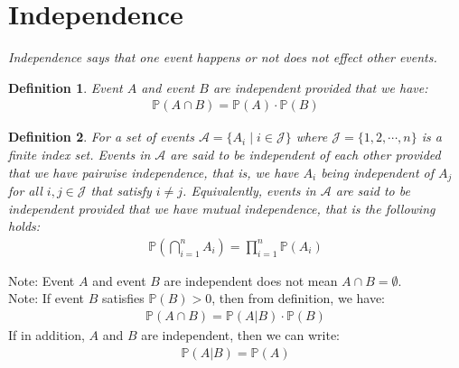 \documentclass[11pt]{book}
\theoremstyle{break}
\theoremstyle{break}
\newtheorem{defn}{Definition}[corL]
\newcommand{\note}{\color{red}Note: \color{black}}
\begin{document}
\newpage
\section[Independence]{\color{red}Independence\color{black}}
\textit{Independence says that one event happens or not does not effect other events.}
\begin{defn}
Event $A$ and event $B$ are independent provided that we have:
\begin{align*}
\mathbb{P}(A\cap B) = \mathbb{P}(A) \cdot \mathbb{P}(B)
\end{align*}
\end{defn}

\begin{defn}
For a set of events $\mathcal{A} = \{A_i \mid i \in \mathcal{J}\}$ where $\mathcal{J} = \{1,2,\cdots, n\}$ is a finite index set. Events in $\mathcal{A}$ are said to be independent of each other provided that we have pairwise independence, that is, we have $A_i$ being independent of $A_j$ for all $i,j \in \mathcal{J}$ that satisfy $i\neq j$. Equivalently, events in $\mathcal{A}$ are said to be independent provided that we have mutual independence, that is the following holds:
\begin{align*}
\mathbb{P}\left( \bigcap_{i=1}^n A_i \right) = \prod_{i=1}^n \mathbb{P}(A_i)
\end{align*}
\end{defn}

\note Event $A$ and event $B$ are independent does not mean $A\cap B = \emptyset$. \\

\note If event $B$ satisfies $\mathbb{P}(B)>0$, then from definition, we have:
\begin{align*}
\mathbb{P}(A\cap B) = \mathbb{P}(A|B) \cdot \mathbb{P}(B)
\end{align*}
If in addition, $A$ and $B$ are independent, then we can write:
\begin{align*}
\mathbb{P}(A|B) = \mathbb{P}(A)
\end{align*}
\end{document}
